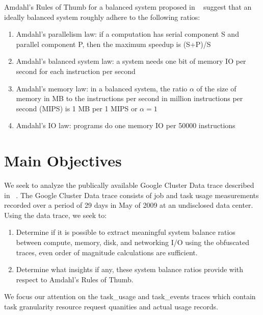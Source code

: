 \documentclass[a0,portrait]{a0poster}
\begin{document}
\begin{multicols}{2}
Amdahl's Rules of Thumb for a balanced system proposed in ~\cite{export:68636, Bell:2006:PCS:1110638.1110681} suggest that an ideally balanced system roughly adhere to the following ratios:
\begin{enumerate}
\item Amdahl's parallelism law: if a computation has serial component S and parallel component P, then the maximum speedup is (S+P)/S
\item Amdahl's balanced system law: a system needs one bit of memory IO per second for each instruction per second
\item Amdahl's memory law: in a balanced system, the ratio $\alpha$ of the size of memory in MB to the instructions per second in million instructions per second (MIPS) is 1 MB per 1 MIPS or $\alpha = 1$
\item Amdahl's IO law: programs do one memory IO per 50000 instructions
\end{enumerate}


\color{DarkSlateGray} %

\section*{Main Objectives}

We seek to analyze the publically available Google Cluster Data trace described in ~\cite{clusterdata:Reiss2011}.
The Google Cluster Data trace consists of job and task usage measurements recorded over a period of 29 days in May of 2009 at an undisclosed data center. 
Using the data trace, we seek to:

\begin{enumerate}
\item[1] Determine if it is possible to extract meaningful system balance ratios between compute, memory, disk, and networking I/O using the obfuscated traces, even order of magnitude calculations are sufficient.
\item[2] Determine what insights if any, these system balance ratios provide with respect to Amdahl's Rules of Thumb.
\end{enumerate}

We focus our attention on the task\_usage and task\_events traces which contain task granularity resource request quanities and actual usage records.


\end{multicols}
\end{document}
